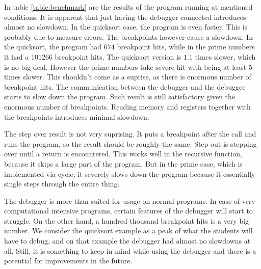 In table \ref{table:benchmark} are the results of the program running at
mentioned conditions. It is apparent that just having the debugger connected
introduces almost no slowdown. In the quicksort case, the program is even
faster. This is probably due to measure errors. The breakpoints however cause a
slowdown. In the quicksort, the program had $674$ breakpoint hits, while in the
prime numbers it had a $101266$ breakpoint hits. The quicksort version is $1.1$
times slower, which is no big deal. However the prime numbers take severe hit
with being at least $5$ times slower. This shouldn't come as a suprise, as
there is enormous number of breakpoint hits. The communication between the
debugger and the debuggee starts to slow down the program. Such result is still
satisfactory given the enormous number of breakpoints. Reading memory and
registers together with the breakpoints introduces minimal slowdown.

The step over result is not very suprising. It puts a breakpoint after the call
and runs the program, so the result should be roughly the same. Step out is
stepping over until a return is encountered. This works well in the recursive
function, because it skips a large part of the program. But in the prime case,
which is implemented via cycle, it severely slows down the program because it
essentially single steps through the entire thing.

The debugger is more than suited for usage on normal programs. In case of very
computational intensive programs, certain features of the debugger will start
to struggle. On the other hand, a hundred thousand breakpoint hits is a very
big number. We consider the quicksort example as a peak of what the students
will have to debug, and on that example the debugger had almost no slowdowns at
all. Still, it is something to keep in mind while using the debugger and there
is a potential for improvements in the future.
